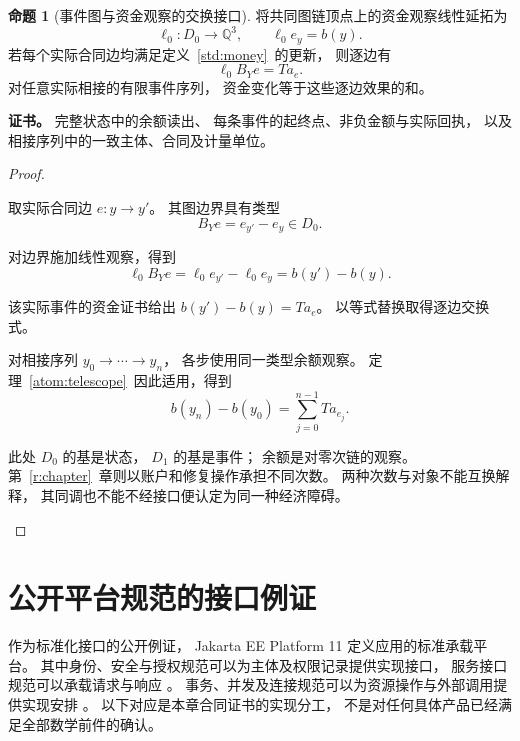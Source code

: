 \documentclass[UTF8,12pt,a4paper,openany,fontset=none,zihao=false]{ctexrep}
\theoremstyle{definition}
\newtheorem{proposition}{命题}[chapter]
\newenvironment{certificate}{\par\noindent\textbf{证书。}\ignorespaces}{\par}
\newcommand{\1}{\mathbf 1}
\begin{document}
\begin{proposition}[事件图与资金观察的交换接口]
\label{std:ledger-interface}
将共同图链顶点上的资金观察线性延拓为
\[
\ell_0:D_0\longrightarrow\mathbb Q^3,
\qquad \ell_0e_y=b(y).
\]
若每个实际合同边均满足定义~\ref{std:money}~的更新，
则逐边有
\[
\ell_0B_Ye=Ta_e.
\]
对任意实际相接的有限事件序列，
资金变化等于这些逐边效果的和。
\end{proposition}
\begin{certificate}
完整状态中的余额读出、
每条事件的起终点、非负金额与实际回执，
以及相接序列中的一致主体、合同及计量单位。
\end{certificate}
\begin{proof}
\begin{semanticsteps}
\item 取实际合同边 \(e:y\to y'\)。
其图边界具有类型
\[
B_Ye=e_{y'}-e_y\in D_0.
\]
\item 对边界施加线性观察，得到
\[
\ell_0B_Ye
=\ell_0e_{y'}-\ell_0e_y
=b(y')-b(y).
\]
\item 该实际事件的资金证书给出
\(b(y')-b(y)=Ta_e\)。
以等式替换取得逐边交换式。
\item 对相接序列 \(y_0\to\cdots\to y_n\)，
各步使用同一类型余额观察。
定理~\ref{atom:telescope}~因此适用，得到
\[
b(y_n)-b(y_0)=\sum_{j=0}^{n-1}Ta_{e_j}.
\]
\item 此处 \(D_0\) 的基是状态，
\(D_1\) 的基是事件；
余额是对零次链的观察。
第~\ref{r:chapter}~章则以账户和修复操作承担不同次数。
两种次数与对象不能互换解释，
其同调也不能不经接口便认定为同一种经济障碍。
\end{semanticsteps}
\end{proof}

\section{公开平台规范的接口例证}

作为标准化接口的公开例证，
Jakarta EE Platform 11 定义应用的标准承载平台\cite{JakartaPlatform11}。
其中身份、安全与授权规范可以为主体及权限记录提供实现接口，
服务接口规范可以承载请求与响应
\cite{JakartaSecurity4,JakartaAuthorization3,JakartaREST4}。
事务、并发及连接规范可以为资源操作与外部调用提供实现安排
\cite{JakartaTransactions2,JakartaConcurrency31,JakartaConnectors21}。
以下对应是本章合同证书的实现分工，
不是对任何具体产品已经满足全部数学前件的确认。
\end{document}
